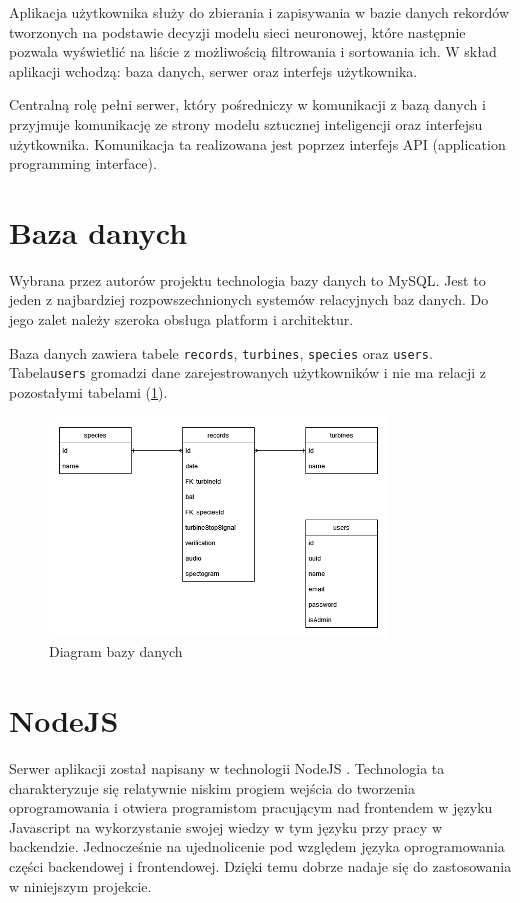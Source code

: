 \documentclass{sprz}
\begin{document}
Aplikacja użytkownika służy do zbierania i zapisywania w bazie danych rekordów tworzonych na podstawie decyzji modelu sieci neuronowej, które następnie pozwala wyświetlić na liście z możliwością filtrowania i sortowania ich. W skład aplikacji wchodzą: baza danych, serwer oraz interfejs użytkownika.

Centralną rolę pełni serwer, który pośredniczy w komunikacji z bazą danych i przyjmuje komunikację ze strony modelu sztucznej inteligencji oraz interfejsu użytkownika. Komunikacja ta realizowana jest poprzez interfejs API (application programming interface).
\clearpage

\section{Baza danych}

Wybrana przez autorów projektu technologia bazy danych to MySQL. Jest to jeden z najbardziej rozpowszechnionych systemów relacyjnych baz danych. Do jego zalet należy szeroka obsługa platform i architektur.

Baza danych zawiera tabele \verb|records|, \verb|turbines|, \verb|species| oraz \verb|users|. Tabela\verb|users| gromadzi dane zarejestrowanych użytkowników i nie ma relacji z pozostałymi tabelami (\ref{img:db_diagram}).

\begin{figure}[h]
  \centering
  \includegraphics[width=0.8\textwidth]{sprz/db_diagram}
  \caption{Diagram bazy danych}
  \label{img:db_diagram}
\end{figure}

\section{NodeJS}

Serwer aplikacji został napisany w technologii NodeJS \cite{nodejs}. Technologia ta charakteryzuje się relatywnie niskim progiem wejścia do tworzenia oprogramowania i otwiera programistom pracującym nad frontendem w języku Javascript na wykorzystanie swojej wiedzy w tym języku przy pracy w backendzie. Jednocześnie na ujednolicenie pod względem języka oprogramowania części backendowej i frontendowej. Dzięki temu dobrze nadaje się do zastosowania w niniejszym projekcie.
\end{document}
